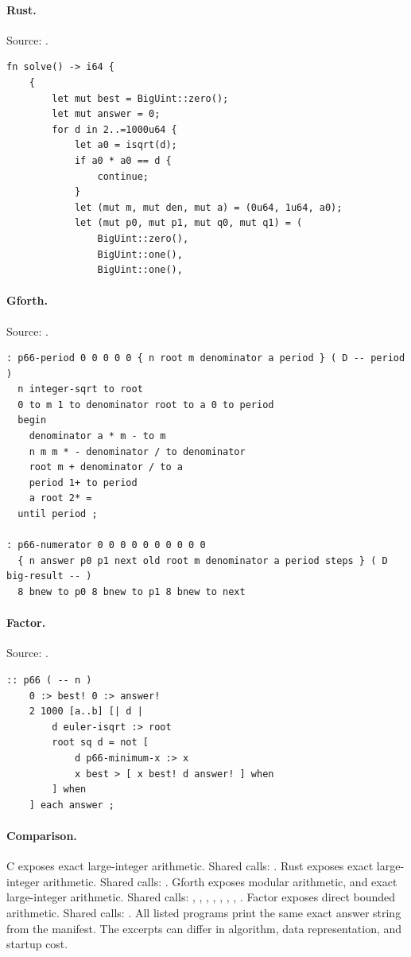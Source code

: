 \paragraph{Rust.} Source: .
\begin{lstlisting}
fn solve() -> i64 {
    {
        let mut best = BigUint::zero();
        let mut answer = 0;
        for d in 2..=1000u64 {
            let a0 = isqrt(d);
            if a0 * a0 == d {
                continue;
            }
            let (mut m, mut den, mut a) = (0u64, 1u64, a0);
            let (mut p0, mut p1, mut q0, mut q1) = (
                BigUint::zero(),
                BigUint::one(),
                BigUint::one(),
\end{lstlisting}

\paragraph{Gforth.} Source: .
\begin{lstlisting}
: p66-period 0 0 0 0 0 { n root m denominator a period } ( D -- period )
  n integer-sqrt to root
  0 to m 1 to denominator root to a 0 to period
  begin
    denominator a * m - to m
    n m m * - denominator / to denominator
    root m + denominator / to a
    period 1+ to period
    a root 2* =
  until period ;

: p66-numerator 0 0 0 0 0 0 0 0 0 0
  { n answer p0 p1 next old root m denominator a period steps } ( D big-result -- )
  8 bnew to p0 8 bnew to p1 8 bnew to next
\end{lstlisting}

\paragraph{Factor.} Source: .
\begin{lstlisting}
:: p66 ( -- n )
    0 :> best! 0 :> answer!
    2 1000 [a..b] [| d |
        d euler-isqrt :> root
        root sq d = not [
            d p66-minimum-x :> x
            x best > [ x best! d answer! ] when
        ] when
    ] each answer ;
\end{lstlisting}

\paragraph{Comparison.}
C exposes exact large-integer arithmetic. Shared calls: \texttt{}. Rust exposes exact large-integer arithmetic. Shared calls: \texttt{}. Gforth exposes modular arithmetic, and exact large-integer arithmetic. Shared calls: \texttt{}, \texttt{}, \texttt{}, \texttt{}, \texttt{}, \texttt{}, \texttt{}, \texttt{}. Factor exposes direct bounded arithmetic. Shared calls: \texttt{}.
All listed programs print the same exact answer string from the manifest. The excerpts can differ in algorithm, data representation, and startup cost.

